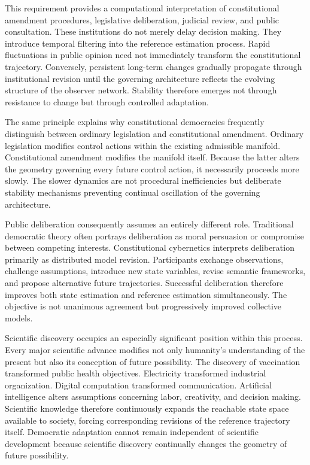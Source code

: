 \documentclass[12pt,a4paper]{article}
\begin{document}
This requirement provides a computational interpretation of constitutional amendment procedures, legislative deliberation, judicial review, and public consultation. These institutions do not merely delay decision making. They introduce temporal filtering into the reference estimation process. Rapid fluctuations in public opinion need not immediately transform the constitutional trajectory. Conversely, persistent long-term changes gradually propagate through institutional revision until the governing architecture reflects the evolving structure of the observer network. Stability therefore emerges not through resistance to change but through controlled adaptation.

The same principle explains why constitutional democracies frequently distinguish between ordinary legislation and constitutional amendment. Ordinary legislation modifies control actions within the existing admissible manifold. Constitutional amendment modifies the manifold itself. Because the latter alters the geometry governing every future control action, it necessarily proceeds more slowly. The slower dynamics are not procedural inefficiencies but deliberate stability mechanisms preventing continual oscillation of the governing architecture.

Public deliberation consequently assumes an entirely different role. Traditional democratic theory often portrays deliberation as moral persuasion or compromise between competing interests. Constitutional cybernetics interprets deliberation primarily as distributed model revision. Participants exchange observations, challenge assumptions, introduce new state variables, revise semantic frameworks, and propose alternative future trajectories. Successful deliberation therefore improves both state estimation and reference estimation simultaneously. The objective is not unanimous agreement but progressively improved collective models.

Scientific discovery occupies an especially significant position within this process. Every major scientific advance modifies not only humanity's understanding of the present but also its conception of future possibility. The discovery of vaccination transformed public health objectives. Electricity transformed industrial organization. Digital computation transformed communication. Artificial intelligence alters assumptions concerning labor, creativity, and decision making. Scientific knowledge therefore continuously expands the reachable state space available to society, forcing corresponding revisions of the reference trajectory itself. Democratic adaptation cannot remain independent of scientific development because scientific discovery continually changes the geometry of future possibility.
\end{document}
